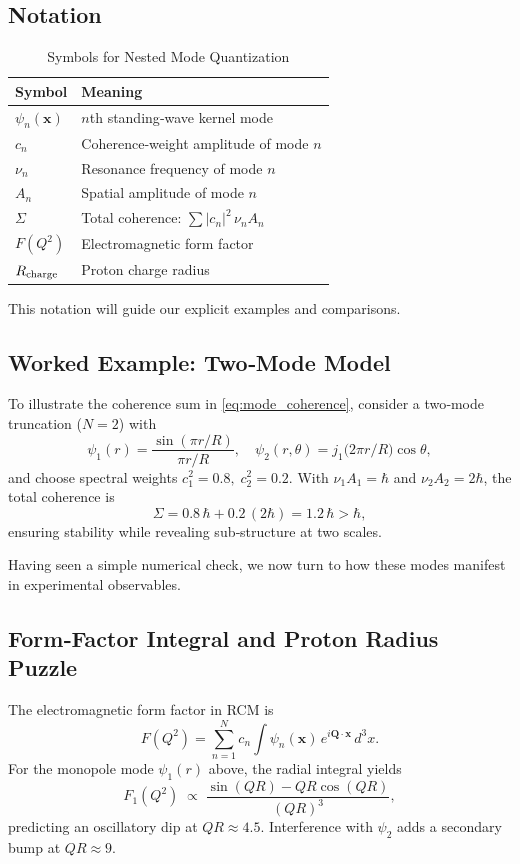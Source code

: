 \subsection{Notation}
\begin{table}[ht]
  \centering
  \caption{Symbols for Nested Mode Quantization}
  \label{tab:mode_notation}
  \begin{tabular}{@{}ll@{}}
    \toprule
    Symbol & Meaning \\
    \midrule
    \(\psi_n(\mathbf x)\) & \(n\)th standing‐wave kernel mode \\
    \(c_n\)               & Coherence‐weight amplitude of mode \(n\) \\
    \(\nu_n\)             & Resonance frequency of mode \(n\) \\
    \(A_n\)               & Spatial amplitude of mode \(n\) \\
    \(\Sigma\)            & Total coherence: \(\sum |c_n|^2\,\nu_n A_n\) \\
    \(F(Q^2)\)            & Electromagnetic form factor \\
    \(R_{\rm charge}\)    & Proton charge radius \\
    \bottomrule
  \end{tabular}
\end{table}

\bigskip
\noindent This notation will guide our explicit examples and comparisons.

\subsection{Worked Example: Two‐Mode Model}
To illustrate the coherence sum in \eqref{eq:mode_coherence}, consider a two‐mode truncation (\(N=2\)) with
\[
\psi_1(r)=\frac{\sin(\pi r/R)}{\pi r/R},\quad 
\psi_2(r,\theta)=j_1\!\bigl(2\pi r/R\bigr)\cos\theta,
\]
and choose spectral weights \(c_1^2=0.8,\;c_2^2=0.2\).  With \(\nu_1 A_1=\hbar\) and \(\nu_2 A_2=2\hbar\), the total coherence is
\[
\Sigma = 0.8\,\hbar + 0.2\,(2\hbar) = 1.2\,\hbar > \hbar,
\]
ensuring stability while revealing sub‐structure at two scales.

\bigskip
\noindent Having seen a simple numerical check, we now turn to how these modes manifest in experimental observables.

\subsection{Form‐Factor Integral and Proton Radius Puzzle}
The electromagnetic form factor in RCM is
\begin{equation}\label{eq:form_factor}
F(Q^2) = \sum_{n=1}^N c_n \int \psi_n(\mathbf x)\,e^{i\mathbf Q\cdot\mathbf x}\,d^3x.
\end{equation}
For the monopole mode \(\psi_1(r)\) above, the radial integral yields
\[
F_1(Q^2)\;\propto\;\frac{\sin(QR)-QR\cos(QR)}{(QR)^3},
\]
predicting an oscillatory dip at \(QR\approx4.5\).  Interference with \(\psi_2\) adds a secondary bump at \(QR\approx9\).

